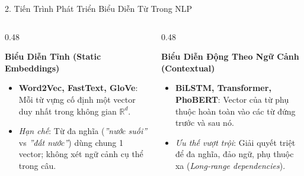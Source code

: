 \documentclass[aspectratio=169, 10pt]{beamer}
\begin{document}
\begin{frame}{2. Tiến Trình Phát Triển Biểu Diễn Từ Trong NLP}
  \vspace{0.35cm}
  \begin{columns}[T, onlytextwidth]
    \begin{column}{0.48\textwidth}
      \begin{block}{\small\textbf{Biểu Diễn Tĩnh (Static Embeddings)}}
        \fontsize{8}{10.5}\selectfont
        \begin{itemize}\setlength{\itemsep}{0.25em}
          \item \textbf{Word2Vec, FastText, GloVe}: Mỗi từ vựng cố định một vector duy nhất trong không gian $\mathbb{R}^d$.
          \item \textit{Hạn chế}: Từ đa nghĩa (\textit{''nước suối''} vs \textit{''đất nước''}) dùng chung 1 vector; không xét ngữ cảnh cụ thể trong câu.
        \end{itemize}
      \end{block}
    \end{column}
    \hfill
    \begin{column}{0.48\textwidth}
      \begin{block}{\small\textbf{Biểu Diễn Động Theo Ngữ Cảnh (Contextual)}}
        \fontsize{8}{10.5}\selectfont
        \begin{itemize}\setlength{\itemsep}{0.25em}
          \item \textbf{BiLSTM, Transformer, PhoBERT}: Vector của từ phụ thuộc hoàn toàn vào các từ đứng trước và sau nó.
          \item \textit{Ưu thế vượt trội}: Giải quyết triệt để đa nghĩa, đảo ngữ, phụ thuộc xa (\textit{Long-range dependencies}).
        \end{itemize}
      \end{block}
    \end{column}
  \end{columns}
\end{frame}
\end{document}
